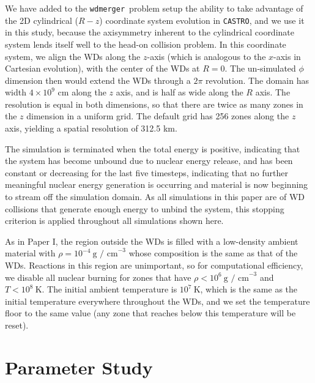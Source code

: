 \documentclass[twocolumn,numberedappendix]{../aastex6}
\newcommand{\castro}{\texttt{CASTRO}}
\newcommand{\wdmerger}{\texttt{wdmerger}}
\begin{document}
We have added to the \wdmerger\ problem setup the ability to take advantage of 
the 2D cylindrical ($R-z$) coordinate system evolution in \castro, and we use it
in this study, because the axisymmetry inherent to the cylindrical coordinate system
lends itself well to the head-on collision problem. In this coordinate system, we
align the WDs along the $z$-axis (which is analogous to the $x$-axis in Cartesian
evolution), with the center of the WDs at $R = 0$. The un-simulated $\phi$ dimension
then would extend the WDs through a $2\pi$ revolution. The domain has width $4 \times 10^{9}$
cm along the $z$ axis, and is half as wide along the $R$ axis. The resolution is equal
in both dimensions, so that there are twice as many zones in the $z$ dimension in
a uniform grid. The default grid has 256 zones along the $z$ axis, yielding a
spatial resolution of 312.5 km.

The simulation is terminated when the total energy is positive, indicating that
the system has become unbound due to nuclear energy release, and has been
constant or decreasing for the last five timesteps, indicating that no further
meaningful nuclear energy generation is occurring and material is now beginning
to stream off the simulation domain. As all simulations in this paper are of
WD collisions that generate enough energy to unbind the system, this stopping
criterion is applied throughout all simulations shown here.

As in Paper I, the region outside the WDs is filled with a low-density ambient
material with $\rho = 10^{-4}\ \text{g / cm}^{-3}$ whose composition is the
same as that of the WDs. Reactions in this region are unimportant, so for
computational efficiency, we disable all nuclear burning for zones that have
$\rho < 10^6\ \text{g / cm}^{-3}$ and $T < 10^8\ \text{K}$. The initial ambient
temperature is $10^7\ \text{K}$, which is the same as the initial temperature
everywhere throughout the WDs, and we set the temperature floor to the same
value (any zone that reaches below this temperature will be reset).



\section{Parameter Study}
\label{sec:parameters}
\end{document}
